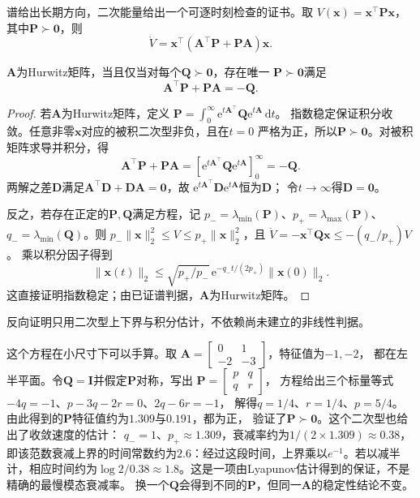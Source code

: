 谱给出长期方向，二次能量给出一个可逐时刻检查的证书。取
$V(\bm x)=\bm x^\top\bm P\bm x$，其中$\bm P\succ\bm0$，则
\begin{equation}
  \dot V=\bm x^\top(\bm A^\top\bm P+\bm P\bm A)\bm x.
  \label{eq:dynamical-continuous-lyapunov-derivative}
\end{equation}
\begin{theorem}[线性Lyapunov方程]
  \label{thm:dynamical-linear-lyapunov-equation}
  $\bm A$为Hurwitz矩阵，当且仅当对每个$\bm Q\succ\bm0$，存在唯一
  $\bm P\succ\bm0$满足
  \begin{equation}
    \bm A^\top\bm P+\bm P\bm A=-\bm Q.
    \label{eq:dynamical-continuous-lyapunov-equation}
  \end{equation}
\end{theorem}
\begin{proof}
  若$\bm A$为Hurwitz矩阵，定义
  $\bm P=\int_0^\infty\mathrm e^{t\bm A^\top}\bm Q\mathrm e^{t\bm A}\,\mathrm dt$。
  指数稳定保证积分收敛。任意非零$\bm x$对应的被积二次型非负，且在$t=0$
  严格为正，所以$\bm P\succ\bm0$。对被积矩阵求导并积分，得
  \[
    \bm A^\top\bm P+\bm P\bm A
    =[\mathrm e^{t\bm A^\top}\bm Q\mathrm e^{t\bm A}]_0^\infty=-\bm Q.
  \]
  两解之差$\bm D$满足$\bm A^\top\bm D+\bm D\bm A=\bm0$，故
  $\mathrm e^{t\bm A^\top}\bm D\mathrm e^{t\bm A}$恒为$\bm D$；
  令$t\to\infty$得$\bm D=\bm0$。

  反之，若存在正定的$\bm P,\bm Q$满足方程，记
  $p_-=\lambda_{\min}(\bm P)$、$p_+=\lambda_{\max}(\bm P)$、
  $q_-=\lambda_{\min}(\bm Q)$。则
  $p_-\|\bm x\|_2^2\leq V\leq p_+\|\bm x\|_2^2$，且
  $\dot V=-\bm x^\top\bm Q\bm x\leq-(q_-/p_+)V$。
  乘以积分因子得到
  \[
    \|\bm x(t)\|_2
    \leq\sqrt{p_+/p_-}\,
      \mathrm e^{-q_-t/(2p_+)}\|\bm x(0)\|_2.
  \]
  这直接证明指数稳定；由已证谱判据，$\bm A$为Hurwitz矩阵。
\end{proof}
反向证明只用二次型上下界与积分估计，不依赖尚未建立的非线性判据。

这个方程在小尺寸下可以手算。取
\(\bm A=\begin{bmatrix}0&1\\-2&-3\end{bmatrix}\)，特征值为\(-1,-2\)，
都在左半平面。令\(\bm Q=\bm I\)并假定\(\bm P\)对称，写出
\(\bm P=\begin{bmatrix}p&q\\q&r\end{bmatrix}\)，
方程给出三个标量等式\(-4q=-1\)、\(p-3q-2r=0\)、\(2q-6r=-1\)，
解得\(q=1/4\)、\(r=1/4\)、\(p=5/4\)。
由此得到的\(\bm P\)特征值约为\(1.309\)与\(0.191\)，都为正，
验证了\(\bm P\succ\bm0\)。这个二次型也给出了收敛速度的估计：
\(q_-=1\)、\(p_+\approx1.309\)，衰减率约为\(1/(2\times1.309)\approx0.38\)，
即该范数衰减上界的时间常数约为\(2.6\)：经过这段时间，上界乘以\(e^{-1}\)。若以减半计，相应时间约为\(\log 2/0.38\approx1.8\)。这是一项由Lyapunov估计得到的保证，不是精确的最慢模态衰减率。
换一个\(\bm Q\)会得到不同的\(\bm P\)，但同一\(\bm A\)的稳定性结论不变。

